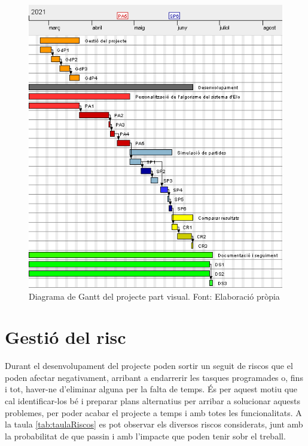 \documentclass[a4paper]{article}
\begin{document}
        \begin{figure}[h!]
        \centering
            \includegraphics[width=1.05
            \textwidth]{images/GantElo.png}%
            \caption[Diagrama de Gantt del projecte part visual]{Diagrama de Gantt del projecte part visual. Font: Elaboració pròpia}
            \label{fig:GanttElo}
        \end{figure}
        
\section{Gestió del risc}
Durant el desenvolupament del projecte poden sortir un seguit de riscos que el poden afectar negativament, arribant a endarrerir les tasques programades o, fins i tot, haver-ne d'eliminar alguna per la falta de temps. És per aquest motiu que cal identificar-los bé i preparar plans alternatius per arribar a solucionar aquests problemes, per poder acabar el projecte a temps i amb totes les funcionalitats. A la taula \ref{tab:taulaRiscos} es pot observar els diversos riscos considerats, junt amb la probabilitat de que passin i amb l'impacte que poden tenir sobr el treball.
\end{document}
